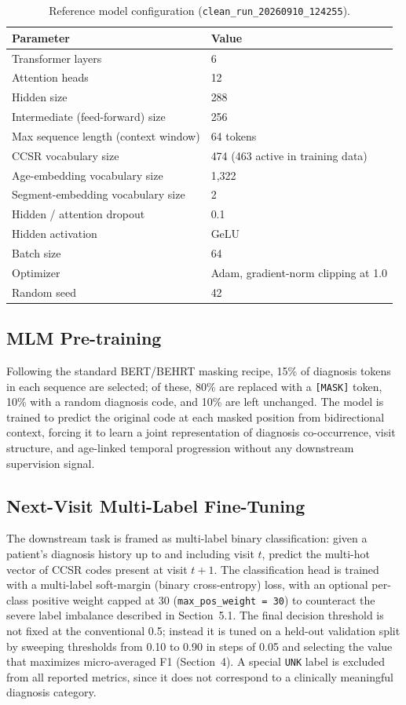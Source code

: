 \documentclass[11pt]{article}
\begin{document}
\begin{table}[h]
\centering
\caption{Reference model configuration
(\texttt{clean\_run\_20260910\_124255}).}
\label{tab:arch}
\begin{tabular}{ll}
\toprule
Parameter & Value \\
\midrule
Transformer layers & 6 \\
Attention heads & 12 \\
Hidden size & 288 \\
Intermediate (feed-forward) size & 256 \\
Max sequence length (context window) & 64 tokens \\
CCSR vocabulary size & 474 (463 active in training data) \\
Age-embedding vocabulary size & 1{,}322 \\
Segment-embedding vocabulary size & 2 \\
Hidden / attention dropout & 0.1 \\
Hidden activation & GeLU \\
Batch size & 64 \\
Optimizer & Adam, gradient-norm clipping at 1.0 \\
Random seed & 42 \\
\bottomrule
\end{tabular}
\end{table}

\subsection{MLM Pre-training}

Following the standard BERT/BEHRT masking recipe, 15\% of diagnosis tokens in
each sequence are selected; of these, 80\% are replaced with a
\texttt{[MASK]} token, 10\% with a random diagnosis code, and 10\% are left
unchanged. The model is trained to predict the original code at each masked
position from bidirectional context, forcing it to learn a joint
representation of diagnosis co-occurrence, visit structure, and age-linked
temporal progression without any downstream supervision signal.

\subsection{Next-Visit Multi-Label Fine-Tuning}

The downstream task is framed as multi-label binary classification: given a
patient's diagnosis history up to and including visit $t$, predict the
multi-hot vector of CCSR codes present at visit $t+1$. The classification head
is trained with a multi-label soft-margin (binary cross-entropy) loss, with an
optional per-class positive weight capped at 30 (\texttt{max\_pos\_weight =
30}) to counteract the severe label imbalance described in Section~5.1. The
final decision threshold is not fixed at the conventional 0.5; instead it is
tuned on a held-out validation split by sweeping thresholds from 0.10 to 0.90
in steps of 0.05 and selecting the value that maximizes micro-averaged F1
(Section~4). A special \texttt{UNK} label is excluded from all reported
metrics, since it does not correspond to a clinically meaningful diagnosis
category.
\end{document}
